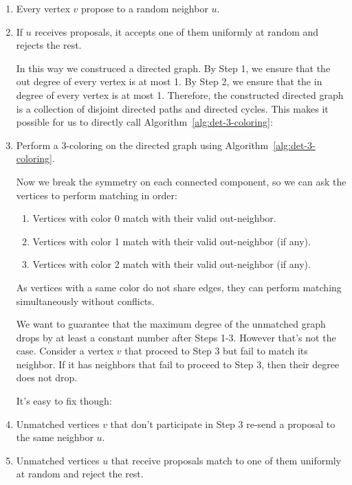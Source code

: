 \begin{enumerate}
	\item Every vertex $v$ propose to a random neighbor $u$.
	\item If $u$ receives proposals, it accepts one of them uniformly at random and rejects the rest.

	      In this way we construced a directed graph. By Step 1, we ensure that the out degree of every vertex is at most 1. By Step 2, we ensure that the in degree of every vertex is at most 1. Therefore, the constructed directed graph is a collection of disjoint directed paths and directed cycles. This makes it possible for us to directly call Algorithm~\ref{alg:det-3-coloring}:

	\item Perform a 3-coloring on the directed graph using Algorithm~\ref{alg:det-3-coloring}.

	      Now we break the symmetry on each connected component, so we can ask the vertices to perform matching in order:

	      \begin{enumerate}
		      \item Vertices with color 0 match with their valid out-neighbor.
		      \item Vertices with color 1 match with their valid out-neighbor (if any).
		      \item Vertices with color 2 match with their valid out-neighbor (if any).
	      \end{enumerate}

	      As vertices with a same color do not share edges, they can perform matching simultaneously without conflicts.

	      We want to guarantee that the maximum degree of the unmatched graph drops by at least a constant number after Steps 1-3. However that's not the case.
	      Consider a vertex $v$ that proceed to Step 3 but fail to match its neighbor. If it has neighbors that fail to proceed to Step 3, then their degree does not drop.

	      It's easy to fix though:

	\item Unmatched vertices $v$ that don't participate in Step 3 re-send a proposal to the same neighbor $u$.

	\item Unmatched vertices $u$ that receive proposals match to one of them uniformly at random and reject the rest.
\end{enumerate}

